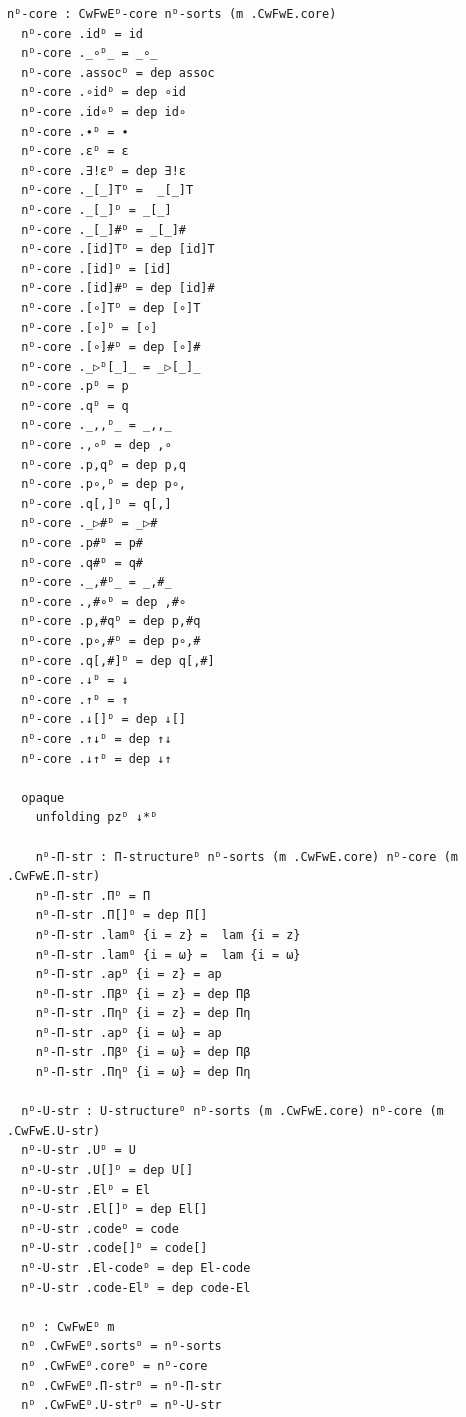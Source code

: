 {\begin{Verbatim}[breaklines=true,breakanywhere=true,fontsize=\scriptsize]
  nᴰ-core : CwFwEᴰ-core nᴰ-sorts (m .CwFwE.core)
  nᴰ-core .idᴰ = id
  nᴰ-core ._∘ᴰ_ = _∘_
  nᴰ-core .assocᴰ = dep assoc
  nᴰ-core .∘idᴰ = dep ∘id
  nᴰ-core .id∘ᴰ = dep id∘
  nᴰ-core .∙ᴰ = ∙
  nᴰ-core .εᴰ = ε
  nᴰ-core .∃!εᴰ = dep ∃!ε
  nᴰ-core ._[_]Tᴰ =  _[_]T
  nᴰ-core ._[_]ᴰ = _[_]
  nᴰ-core ._[_]#ᴰ = _[_]#
  nᴰ-core .[id]Tᴰ = dep [id]T
  nᴰ-core .[id]ᴰ = [id]
  nᴰ-core .[id]#ᴰ = dep [id]#
  nᴰ-core .[∘]Tᴰ = dep [∘]T
  nᴰ-core .[∘]ᴰ = [∘]
  nᴰ-core .[∘]#ᴰ = dep [∘]#
  nᴰ-core ._▷ᴰ[_]_ = _▷[_]_
  nᴰ-core .pᴰ = p
  nᴰ-core .qᴰ = q
  nᴰ-core ._,,ᴰ_ = _,,_
  nᴰ-core .,∘ᴰ = dep ,∘
  nᴰ-core .p,qᴰ = dep p,q
  nᴰ-core .p∘,ᴰ = dep p∘,
  nᴰ-core .q[,]ᴰ = q[,]
  nᴰ-core ._▷#ᴰ = _▷#
  nᴰ-core .p#ᴰ = p#
  nᴰ-core .q#ᴰ = q#
  nᴰ-core ._,#ᴰ_ = _,#_
  nᴰ-core .,#∘ᴰ = dep ,#∘
  nᴰ-core .p,#qᴰ = dep p,#q
  nᴰ-core .p∘,#ᴰ = dep p∘,#
  nᴰ-core .q[,#]ᴰ = dep q[,#]
  nᴰ-core .↓ᴰ = ↓
  nᴰ-core .↑ᴰ = ↑
  nᴰ-core .↓[]ᴰ = dep ↓[]
  nᴰ-core .↑↓ᴰ = dep ↑↓
  nᴰ-core .↓↑ᴰ = dep ↓↑

  opaque
    unfolding pzᴰ ↓*ᴰ

    nᴰ-Π-str : Π-structureᴰ nᴰ-sorts (m .CwFwE.core) nᴰ-core (m .CwFwE.Π-str)
    nᴰ-Π-str .Πᴰ = Π
    nᴰ-Π-str .Π[]ᴰ = dep Π[]
    nᴰ-Π-str .lamᴰ {i = z} =  lam {i = z} 
    nᴰ-Π-str .lamᴰ {i = ω} =  lam {i = ω} 
    nᴰ-Π-str .apᴰ {i = z} = ap
    nᴰ-Π-str .Πβᴰ {i = z} = dep Πβ
    nᴰ-Π-str .Πηᴰ {i = z} = dep Πη
    nᴰ-Π-str .apᴰ {i = ω} = ap
    nᴰ-Π-str .Πβᴰ {i = ω} = dep Πβ
    nᴰ-Π-str .Πηᴰ {i = ω} = dep Πη

  nᴰ-U-str : U-structureᴰ nᴰ-sorts (m .CwFwE.core) nᴰ-core (m .CwFwE.U-str)
  nᴰ-U-str .Uᴰ = U
  nᴰ-U-str .U[]ᴰ = dep U[]
  nᴰ-U-str .Elᴰ = El
  nᴰ-U-str .El[]ᴰ = dep El[]
  nᴰ-U-str .codeᴰ = code
  nᴰ-U-str .code[]ᴰ = code[]
  nᴰ-U-str .El-codeᴰ = dep El-code
  nᴰ-U-str .code-Elᴰ = dep code-El

  nᴰ : CwFwEᴰ m
  nᴰ .CwFwEᴰ.sortsᴰ = nᴰ-sorts
  nᴰ .CwFwEᴰ.coreᴰ = nᴰ-core
  nᴰ .CwFwEᴰ.Π-strᴰ = nᴰ-Π-str 
  nᴰ .CwFwEᴰ.U-strᴰ = nᴰ-U-str


\end{Verbatim}
}
